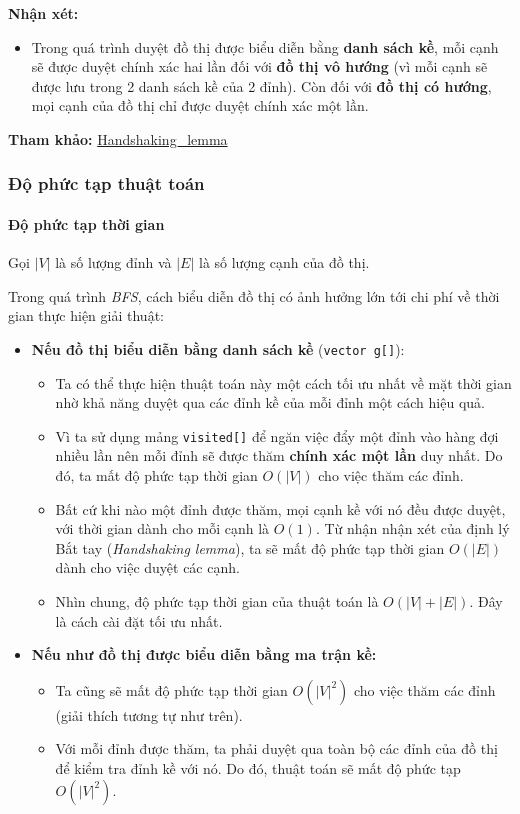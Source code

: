 \documentclass{article}
\begin{document}
\textbf{Nhận xét:}
\begin{itemize}
    \item Trong quá trình duyệt đồ thị được biểu diễn bằng \textbf{danh sách kề}, mỗi cạnh sẽ được duyệt chính xác hai lần đối với \textbf{đồ thị vô hướng} (vì mỗi cạnh sẽ được lưu trong 2 danh sách kề của 2 đỉnh). Còn đối với \textbf{đồ thị có hướng}, mọi cạnh của đồ thị chỉ được duyệt chính xác một lần.
\end{itemize}

\textbf{Tham khảo:} \href{https://en.wikipedia.org/wiki/Handshaking_lemma}{Handshaking\_lemma}

\subsubsection{Độ phức tạp thuật toán}

\paragraph{Độ phức tạp thời gian}

Gọi $|V|$ là số lượng đỉnh và $|E|$ là số lượng cạnh của đồ thị.

Trong quá trình \textit{BFS}, cách biểu diễn đồ thị có ảnh hưởng lớn tới chi phí về thời gian thực hiện giải thuật:

\begin{itemize}
    \item \textbf{Nếu đồ thị biểu diễn bằng danh sách kề} (\texttt{vector g[]}):

    \begin{itemize}
        \item Ta có thể thực hiện thuật toán này một cách tối ưu nhất về mặt thời gian nhờ khả năng duyệt qua các đỉnh kề của mỗi đỉnh một cách hiệu quả.
        \item Vì ta sử dụng mảng \texttt{visited[]} để ngăn việc đẩy một đỉnh vào hàng đợi nhiều lần nên mỗi đỉnh sẽ được thăm \textbf{chính xác một lần} duy nhất. Do đó, ta mất độ phức tạp thời gian $O(|V|)$ cho việc thăm các đỉnh.
        \item Bất cứ khi nào một đỉnh được thăm, mọi cạnh kề với nó đều được duyệt, với thời gian dành cho mỗi cạnh là $O(1)$. Từ nhận nhận xét của định lý Bắt tay (\textit{Handshaking lemma}), ta sẽ mất độ phức tạp thời gian $O(|E|)$ dành cho việc duyệt các cạnh.
        \item Nhìn chung, độ phức tạp thời gian của thuật toán là $O(|V| + |E|)$. Đây là cách cài đặt tối ưu nhất.
    \end{itemize}

    \item \textbf{Nếu như đồ thị được biểu diễn bằng ma trận kề:}
    \begin{itemize}
        \item Ta cũng sẽ mất độ phức tạp thời gian $O(|V|^2)$ cho việc thăm các đỉnh (giải thích tương tự như trên).
        \item Với mỗi đỉnh được thăm, ta phải duyệt qua toàn bộ các đỉnh của đồ thị để kiểm tra đỉnh kề với nó. Do đó, thuật toán sẽ mất độ phức tạp $O(|V|^2)$.
    \end{itemize}
\end{itemize}
\end{document}
